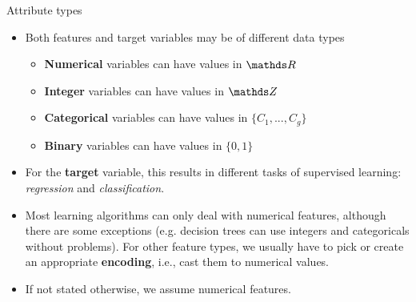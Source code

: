 
\begin{vbframe}{Attribute types}

\begin{itemize}

  \item Both features and target variables may be of different data types 
  
  \begin{itemize}
  
    \item \textbf{Numerical} variables can have values in $\R$
    
    \item \textbf{Integer} variables can have values in $\Z$
    
    \item \textbf{Categorical} variables can have values in $\{C_1,...,C_g\}$
    
    \item \textbf{Binary} variables can have values in $\{0, 1\}$
  
  \end{itemize}
  
  \item For the \textbf{target} variable, this results in different tasks of supervised learning: \textit{regression} and \textit{classification}. 
  
  \item Most learning algorithms can only deal with numerical features,
      although there are some exceptions (e.g. decision trees can use integers and categoricals without problems).
      For other feature types, we usually have to pick or create an
      appropriate \textbf{encoding}, i.e., cast them to numerical values.
  \item If not stated otherwise, we assume numerical features.

\end{itemize}

\end{vbframe}


